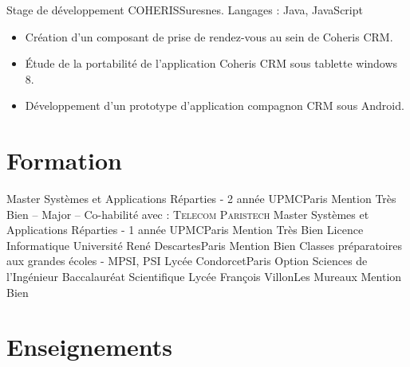 \documentclass[11pt,a4paper,sans]{moderncv}
\begin{document}
\vspace{1em}

        {Stage de développement}
        {\textsc{COHERIS}}{Suresnes. Langages : Java, JavaScript}{}
        {
            \begin{itemize}
                \item Création d'un composant de prise de rendez-vous au sein de Coheris CRM.
                \item\'Etude de la portabilité de l'application Coheris CRM sous tablette windows 8.
                \item Développement d'un prototype d'application compagnon CRM sous Android.
            \end{itemize}
        }

\vspace{0.5em}


\section{Formation}
\vspace{1em}

        {Master Systèmes et Applications Réparties - 2 année}
        {UPMC}{Paris}{}
        {Mention Très Bien -- Major -- Co-habilité avec : \textsc{Telecom Paristech}}
        {Master Systèmes et Applications Réparties - 1 année}
        {UPMC}{Paris}{}
        {Mention Très Bien}
        {Licence Informatique}
        {Université René Descartes}{Paris}{}
        {Mention Bien}
        {Classes préparatoires aux grandes écoles - MPSI, PSI\up{*}}
        {Lycée Condorcet}{Paris}{}
        {Option Sciences de l'Ingénieur}
        {Baccalauréat Scientifique}
        {Lycée François Villon}{Les Mureaux}{}
        {Mention Bien}

\vspace{0.5em}


\section{Enseignements}
\vspace{1em}
\end{document}
